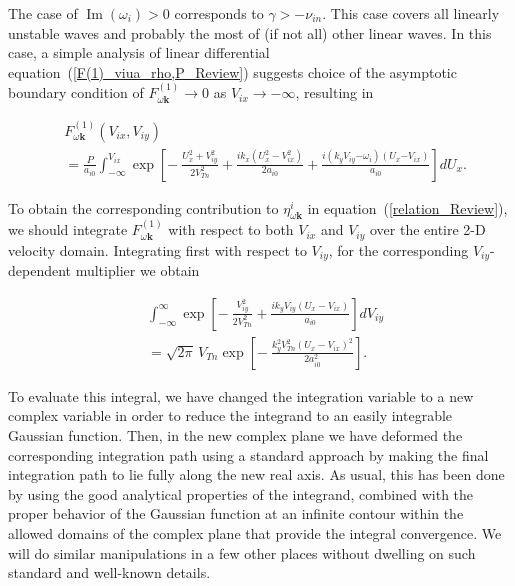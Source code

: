 \documentclass[draft]{agujournal2019}
\renewcommand{\vec}{\mathbf}
\begin{document}
{The case of $\operatorname{Im}(\omega_i)>0$ corresponds to $\gamma>-\nu_{in}$. This case covers all linearly 
unstable waves and probably the most of (if not all) other linear waves. 
In this case, a simple analysis of linear differential equation~(\ref{F(1)_viua_rho,P_Review}) suggests choice of the asymptotic
boundary condition of $F_{\omega\vec{k}}^{(1)}\rightarrow0$ as $V_{ix}\rightarrow-\infty$, resulting in
\begin{linenomath*}
\begin{align}
&  F_{\omega\vec{k}}^{(1)}(V_{ix},V_{iy})\nonumber\\
&  =\frac{P}{a_{i0}}\int_{-\infty}^{V_{ix}}\exp\left[  -\ \frac{U_{x}%
^{2}+V_{iy}^{2}}{2V_{Tn}^{2}}+\frac{ik_{x}\left(  U_{x}^{2}-V_{ix}^{2}\right)
}{2a_{i0}}+\frac{i(k_{y}V_{iy}\mathbf{-}\omega_{i})\left(  U_{x}\mathbf{-}%
V_{ix}\right)  }{a_{i0}}\right]  dU_{x}. 
\label{F^(1)=_Review}
\end{align}
\end{linenomath*}
To obtain the corresponding contribution to $\eta_{\omega\vec{k}}^{i}$ in
equation~(\ref{relation_Review}), we should integrate $F_{\omega\vec{k}}%
^{(1)}$ with respect to both $V_{ix}$ and $V_{iy}$ over the entire 2-D
velocity domain. Integrating first with respect to $V_{iy}$, for the
corresponding $V_{iy}$-dependent multiplier we obtain
\begin{linenomath*}
\begin{align*}
&  \int_{-\infty}^{\infty}\exp\left[  -\ \frac{V_{iy}^{2}}{2V_{Tn}^{2}}%
+\frac{ik_{y}V_{iy}\left(  U_{x}-V_{ix}\right)  }{a_{i0}}\right]  dV_{iy}\\
&  =\sqrt{2\pi}\,V_{Tn}\exp\left[  -\ \frac{k_{y}^{2}V_{Tn}^{2}\left(
U_{x}-V_{ix}\right)  ^{2}}{2a_{i0}^{2}}\right]  .
\end{align*}
\end{linenomath*}
To evaluate this integral, we have changed the integration variable to a new
complex variable in order to reduce the integrand to an easily integrable
Gaussian function. Then, in the new complex plane we have deformed the
corresponding integration path using a standard approach by making the final
integration path to lie fully along the new real axis. As usual, this has been
done by using the good analytical properties of the integrand, combined with
the proper behavior of the Gaussian function at an infinite contour within the
allowed domains of the complex plane that provide the integral convergence. We
will do similar manipulations in a few other places without dwelling on
such standard and well-known details.

}
\end{document}
